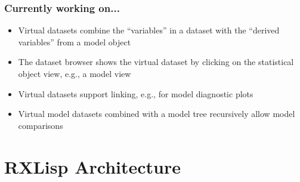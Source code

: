 \documentclass{beamer}
\begin{document}
\begin{frame}
\frametitle{Currently working on...}
\begin{itemize}
	\item Virtual datasets combine the ``variables'' in a dataset with the ``derived variables'' from a model object
	\item The dataset browser shows the virtual dataset by clicking on the statistical object view, e.g., a model view
	\item Virtual datasets support linking, e.g., for  model diagnostic plots
	\item Virtual model datasets combined with a model tree recursively allow model comparisons 
\end{itemize}
\end{frame}

\section{RXLisp Architecture}
\end{document}
